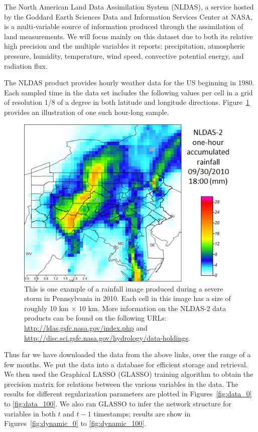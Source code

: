 \documentclass{article}
\begin{document}
The North American Land Data Assimilation System (NLDAS), a service hosted by
the Goddard Earth Sciences Data and Information Services Center at NASA, is a
multi-variable source of information produced through the assimilation of land
measurements. We will focus mainly on this dataset due to both its relative high
precision and the multiple variables it reports: precipitation, atmospheric
pressure, humidity, temperature, wind speed, convective potential energy, and
radiation flux.

The NLDAS product provides hourly weather data for the US beginning in 1980.
Each sampled time in the data set includes the following values per cell in a
grid of resolution 1/8 of a degree in both latitude and longitude directions.
Figure~\ref{fig:example_rainfall} provides an illustration of one such hour-long
sample.


\begin{figure}[ht] \vskip 0.2in
\begin{center}
\centerline{\includegraphics[bb=0 0 487 360,width=\columnwidth]{images/weather.png}}
\caption{This is one example of a rainfall image produced during a severe storm in Pennsylvania in 2010. Each cell in this image has a size of roughly 10 km $\times$ 10 km. More information on the NLDAS-2 data products can be found on the following URLs: \url{http://ldas.gsfc.nasa.gov/index.php} and \url{http://disc.sci.gsfc.nasa.gov/hydrology/data-holdings}.}
\label{fig:example_rainfall}
\end{center}
\vskip -0.2in
\end{figure}

Thus far we have downloaded the data from the above links, over the range of a few months. We put the data into a database for efficient storage and retrieval. We then used the Graphical LASSO (GLASSO) training algorithm to obtain the precision matrix for relations between the various variables in the data. The results for different regularization parameters are plotted in Figures~\ref{fig:data_0} to \ref{fig:data_100}. We also ran GLASSO to infer the network structure for variables in both $t$ and $t - 1$ timestamps; results are show in Figures~\ref{fig:dynamic_0} to \ref{fig:dynamic_100}.
\end{document}
